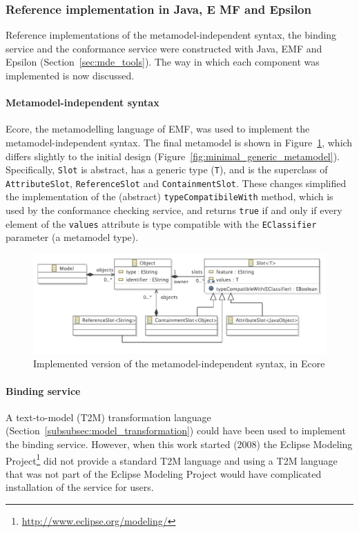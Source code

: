 \subsubsection{Reference implementation in Java, E MF and Epsilon}
\label{subsubsec:mmi_impl}
Reference implementations of the metamodel-independent syntax, the binding service and the conformance service were constructed with Java, EMF and Epsilon (Section~\ref{sec:mde_tools}). The way in which each component was implemented is now discussed.

\paragraph{Metamodel-independent syntax} Ecore, the metamodelling language of EMF, was used to implement the metamodel-independent syntax. The final metamodel is shown in Figure~\ref{fig:mmi_syntax_impl}, which differs slightly to the initial design (Figure~\ref{fig:minimal_generic_metamodel}). Specifically, \texttt{Sl\-ot} is abstract, has a generic type (\texttt{T}), and is the superclass of \texttt{Att\-ri\-bu\-teSl\-ot}, \texttt{Re\-fe\-re\-n\-ceSl\-ot} and \texttt{Co\-nt\-ai\-nm\-entSl\-ot}. These changes simplified the implementation of the (abstract) \texttt{ty\-peCo\-mp\-at\-ib\-i\-leWi\-th} method, which is used by the conformance checking service, and returns \texttt{true} if and only if every element of the \texttt{va\-lu\-es} attribute is type compatible with the \texttt{EC\-la\-ss\-if\-ier} parameter (a metamodel type).  

\begin{figure}[htbp]
  \centering
  \includegraphics[width=12cm]{5.Implementation/images/slot_model_complete.pdf}
  \caption{Implemented version of the metamodel-independent syntax, in Ecore}
  \label{fig:mmi_syntax_impl}
\end{figure}

\paragraph{Binding service} A text-to-model (T2M) transformation language (Section~\ref{subsubsec:model_transformation}) could have been used to implement the binding service. However, when this work started (2008) the Eclipse Modeling Project\footnote{\url{http://www.eclipse.org/modeling/}} did not provide a standard T2M language and using a T2M language that was not part of the Eclipse Modeling Project would have complicated installation of the service for users.

